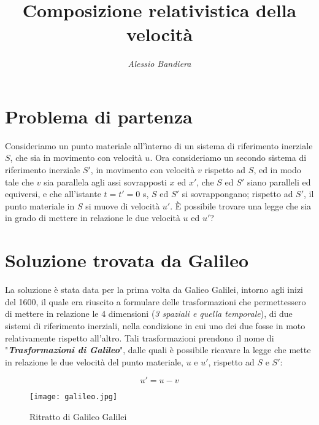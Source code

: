 \documentclass{article}
\begin{document}
\title{\textbf{Composizione relativistica della velocità}}
\author{\textit{Alessio Bandiera}}
\date{} %

\maketitle

\section{Problema di partenza}
\null\par
Consideriamo un punto materiale all'ìnterno di un sistema
di riferimento inerziale \(S\), che sia in movimento con
velocità \(u\). Ora consideriamo un secondo sistema di
riferimento inerziale \(S'\), in movimento con velocità
\(v\) rispetto ad \(S\), ed in modo tale che  \(v\) sia parallela
agli assi sovrapposti \(x\) ed \(x'\), che \(S\) ed \(S'\) siano
paralleli ed equiversi, e che all'istante \(t=t'=0\) s, \(S\)
ed \(S'\) si sovrappongano; rispetto ad \(S'\), il punto
materiale in \(S\) si muove di velocità \(u'\). \`E possibile
trovare una legge che sia in grado di mettere in relazione
le due velocità \(u\) ed \(u'\)?

\section{Soluzione trovata da Galileo}
La soluzione è stata data per la prima volta da Galieo Galilei,
intorno agli inizi del 1600, il quale era riuscito a formulare
delle trasformazioni che permettessero di mettere in relazione
le 4 dimensioni (\textit{3 spaziali e quella temporale}), di due
sistemi di riferimento inerziali, nella condizione in cui uno
dei due fosse in moto relativamente rispetto all'altro. Tali
trasformazioni prendono il nome di "\textbf{\textit{Trasformazioni di Galileo}}",
dalle quali è possibile ricavare la legge che mette in relazione
le due velocità del punto materiale, \(u\) e \(u'\), rispetto
ad \(S\) e \(S'\):

\begin{equation}
    \label{velocità di Galileo}
    u' = u - v
\end{equation}

\begin{figure}[htbp] %
    \label{galileo}
    \centerline{\texttt{[image: galileo.jpg]}}
    \caption{Ritratto di Galileo Galilei}
\end{figure}
\end{document}
